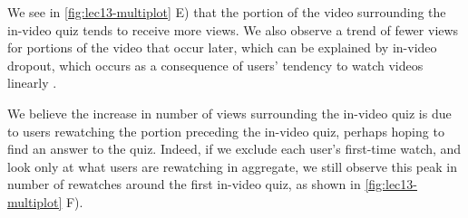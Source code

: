 \documentclass{sigchi}
\begin{document}
We see in \autoref{fig:lec13-multiplot} E) that the portion of the video surrounding the in-video quiz tends to receive more views. We also observe a trend of fewer views for portions of the video that occur later, which can be explained by in-video dropout, which occurs as a consequence of users' tendency to watch videos linearly \cite{juho}.

We believe the increase in number of views surrounding the in-video quiz is due to users rewatching the portion preceding the in-video quiz, perhaps hoping to find an answer to the quiz. Indeed, if we exclude each user's first-time watch, and look only at what users are rewatching in aggregate, we still observe this peak in number of rewatches around the first in-video quiz, as shown in \autoref{fig:lec13-multiplot} F). %


\end{document}
